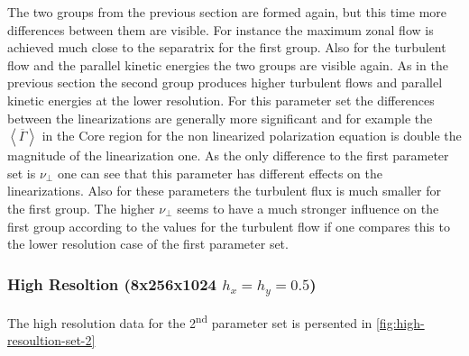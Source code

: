 \documentclass[master.tex]{subfiles}
\begin{document}
The two groups from the previous section are formed again, but this time more differences between them are visible. For instance the maximum zonal flow is achieved much close to the separatrix for the first group.\newline
Also for the turbulent flow and the parallel kinetic energies the two groups are visible again. As in the previous section the second group produces higher turbulent flows and parallel kinetic energies at the lower resolution.\newline
For this parameter set the differences between the linearizations are generally more significant and for example the $\left< \overline{\Gamma} \right>$ in the Core region for the non linearized polarization equation is double the magnitude of the linearization one. As the only difference to the first parameter set is $\nu_\perp$ one can see that this parameter has different effects on the linearizations.\newline
Also for these parameters the turbulent flux is much smaller for the first group. The higher $\nu_\perp$ seems to have a much stronger influence on the first group according to the values for the turbulent flow if one compares this to the lower resolution case of the first parameter set.


\subsubsection{High Resoltion (8x256x1024 $h_x = h_y = 0.5$)}

The high resolution data for the 2\textsuperscript{nd} parameter set is persented in \autoref{fig:high-resoultion-set-2}
\end{document}
